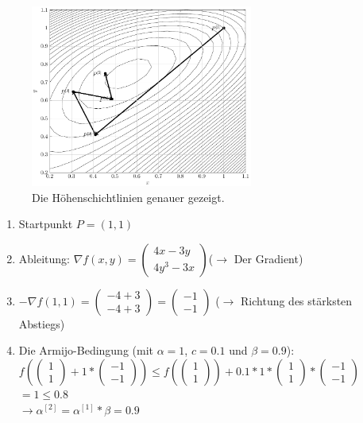 \documentclass[naustrian]{article}
\begin{document}
{\begin{figure}[H]
    \centering
    \includegraphics[width=0.65\textwidth]{grad/figure2}
    \caption{Die Höhenschichtlinien genauer gezeigt.}
\end{figure}

\begin{enumerate}
	\item
	Startpunkt $P=(1,1)$
	\item
	Ableitung: ${\nabla}f(x,y)=
	\left( \begin{array}{c}
	4x-3y \\
	4y^3-3x
	\end{array} \right)
	$($\rightarrow$ Der Gradient)
	\item
	$-{\nabla}f(1,1) =
	\left( \begin{array}{c}
	-4+3 \\
	-4+3
	\end{array} \right)
	=
	\left( \begin{array}{c}
	-1 \\
	-1
	\end{array} \right)
	$ ($\rightarrow$ Richtung des stärksten Abstiegs)
	\item
	Die Armijo-Bedingung (mit $\alpha = 1$, $c = 0.1$ und $\beta = 0.9$):\\
	$f( \left( \begin{array}{c} 1 \\ 1 \end{array} \right) + 1 * \left( \begin{array}{c} -1 \\ -1 \end{array} \right)) \leq f(\left( \begin{array}{c} 1 \\ 1 \end{array} \right)) + 0.1 * 1 *  \left( \begin{array}{c} 1 \\ 1 \end{array} \right) * \left( \begin{array}{c} -1 \\ -1 \end{array} \right)$ \\
	$= 1 \leq 0.8$ \\
	$\rightarrow \alpha^{[2]} = \alpha^{[1]} * \beta = 0.9$ \\


\end{enumerate}}
\end{document}
